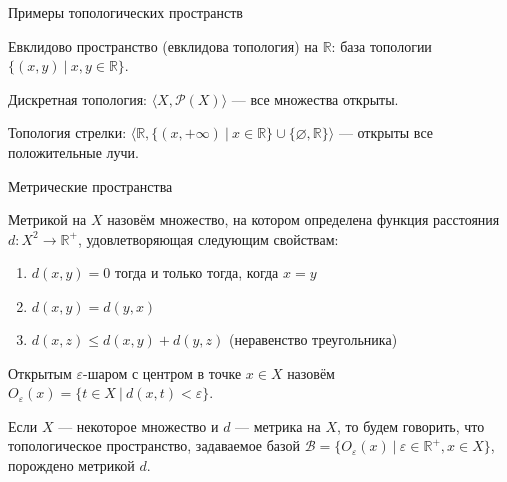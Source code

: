 \documentclass[aspectratio=169]{beamer}
\begin{document}
\begin{frame}{Примеры топологических пространств}
\begin{defrus}Евклидово пространство (евклидова топология) на $\mathbb{R}$: база топологии $\{(x,y)\ |\ x,y \in \mathbb{R}\}$.\end{defrus}
\begin{defrus}Дискретная топология: $\langle X, \mathcal{P}(X) \rangle$ --- все множества открыты.\end{defrus}
\begin{defrus}Топология стрелки: $\langle \mathbb{R}, \{(x,+\infty)\ |\ x\in\mathbb{R}\}\cup\{\varnothing,\mathbb{R}\}\rangle$ --- открыты все положительные лучи.\end{defrus}
\end{frame}

\begin{frame}{Метрические пространства}
\begin{defrus}Метрикой на $X$ назовём множество, на котором определена функция расстояния $d: X^2 \rightarrow \mathbb{R}^+$, 
удовлетворяющая следующим свойствам:
\begin{enumerate}
\item $d(x,y) = 0$ тогда и только тогда, когда $x = y$
\item $d(x,y) = d(y,x)$
\item $d(x,z) \le d(x,y) + d(y,z)$ (неравенство треугольника)
\end{enumerate}
\end{defrus}

\begin{defrus}
Открытым $\varepsilon$-шаром с центром в точке $x \in X$ назовём $O_\varepsilon(x) = \{ t \in X\ |\ d(x,t) < \varepsilon \}$.
\end{defrus}

\begin{defrus}
Если $X$ --- некоторое множество и $d$ --- метрика на $X$, то будем говорить, что топологическое
пространство, задаваемое базой $\mathcal{B} = \{ O_\varepsilon(x)\ |\ \varepsilon \in \mathbb{R}^+, x \in X \}$,
порождено метрикой $d$.
\end{defrus}
\end{frame}
\end{document}
